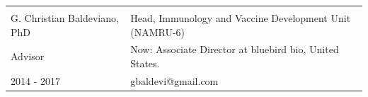 \documentclass[margin,line]{res}
\begin{document}
\begin{resume}
\begin{tabular}{ l l }
	&\\
	G. Christian Baldeviano, PhD & Head, Immunology and Vaccine Development Unit (NAMRU-6)\\
	Advisor & Now: Associate Director at bluebird bio, United States.\\
	2014 - 2017 & gbaldevi@gmail.com\\
	
	
	
	
	
\end{tabular}











\end{resume}
\end{document}
